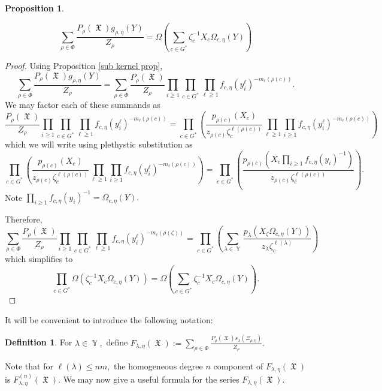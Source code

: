 \documentclass[12pt,reqno]{amsart}
\theoremstyle{definition}
\newtheorem{prop}[thm]{Proposition}
\newtheorem{defn}[thm]{Definition}
\DeclareMathOperator{\Par}{\mathbb{Y}}
\DeclareMathOperator{\fX}{\mathfrak{X}}
\begin{document}
\begin{prop}\label{plethystic kernel formula prop}

    $$\sum_{\rho \in \Phi} \frac{P_{\rho}(\fX)g_{\rho,\eta}(Y)}{Z_{\rho}} = \Omega\left( \sum_{c \in G^*} \zeta_c^{-1} X_{c} \Omega_{c,\eta}(Y) \right)$$
\end{prop}
\begin{proof}
    Using Proposition \ref{sub kernel prop}, 
        $$\sum_{\rho \in \Phi} \frac{P_{\rho}(\fX)g_{\rho,\eta}(Y)}{Z_{\rho}} = \sum_{\rho \in \Phi} \frac{P_{\rho}(\fX)}{Z_{\rho}} \prod_{i \geq 1} \prod_{c \in G^*} \prod_{\ell \geq 1} f_{c,\eta}(y_i^{\ell})^{-m_{\ell}(\rho(c))}.$$ We may factor each of these summands as 
        $$\frac{P_{\rho}(\fX)}{Z_{\rho}} \prod_{i \geq 1} \prod_{c \in G^*} \prod_{\ell \geq 1}f_{c,\eta}(y_i^{\ell})^{-m_{\ell}(\rho(c))} = \prod_{c \in G^*} \left( \frac{p_{\rho(c)}(X_{c})}{z_{\rho(c)} \zeta_c^{\ell(\rho(c))}} \prod_{\ell \geq 1} \prod_{i \geq 1} f_{c,\eta}(y_i^{\ell})^{-m_{\ell}(\rho(c))} \right)$$ which we will write using plethystic substitution as 
        $$\prod_{c \in G^*} \left( \frac{p_{\rho(c)}(X_{c})}{z_{\rho(c)} \zeta_c^{\ell(\rho(c))}} \prod_{\ell \geq 1} \prod_{i \geq 1} f_{c,\eta}(y_i^{\ell})^{-m_{\ell}(\rho(c))} \right) = \prod_{c \in G^*} \left( \frac{p_{\rho(c)}\left(X_{c} \prod_{i \geq 1} f_{c,\eta}(y_i)^{-1} \right)}{z_{\rho(c)} \zeta_c^{\ell(\rho(c))}}  \right).$$ Note $\prod_{i \geq 1} f_{c,\eta}(y_i)^{-1} = \Omega_{c,\eta}(Y).$
        
        
        Therefore, 
        $$\sum_{\rho \in \Phi} \frac{P_{\rho}(\fX)}{Z_{\rho}} \prod_{i \geq 1} \prod_{c \in G^*} \prod_{\ell \geq 1} f_{c,\eta}(y_i^{\ell})^{-m_{\ell}(\rho(\zeta))} = \prod_{c\in G^*}\left( \sum_{\lambda \in \Par} \frac{p_{\lambda}\left(X_{\zeta} \Omega_{c,\eta}(Y) \right)}{z_{\lambda} \zeta_c^{\ell(\lambda)}}\right)$$ which simplifies to 
        $$ \prod_{c \in G^*} \Omega \left( \zeta_c^{-1} X_{c} \Omega_{c,\eta}(Y) \right) = \Omega\left( \sum_{c \in G^*} \zeta_c^{-1} X_{c} \Omega_{c,\eta}(Y) \right).$$
\end{proof}

It will be convenient to introduce the following notation:

\begin{defn}
    For $\lambda \in \Par,$ define $F_{\lambda,\eta}(\fX):= \sum_{\rho \in \Phi} \frac{P_{\rho}(\fX) s_{\lambda}(\Xi_{\rho,\eta})}{Z_{\rho}}.$
\end{defn}

Note that for $\ell(\lambda) \leq nm,$ the homogeneous degree $n$ component of $F_{\lambda,\eta}(\fX)$ is $F^{(n)}_{\lambda,\eta}(\fX).$ We may now give a useful formula for the series $F_{\lambda,\eta}(\fX).$
\end{document}
